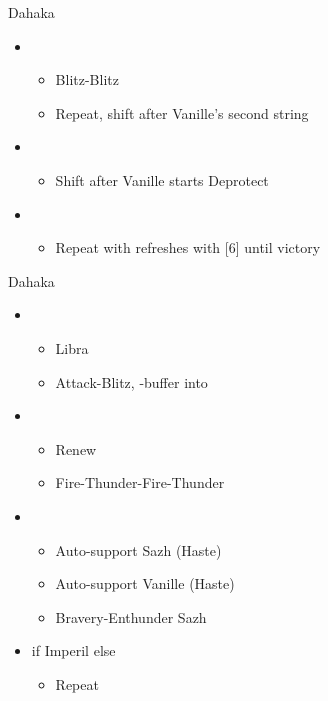 \begin{paracol}{2}
\begin{battle}{Dahaka}
\begin{itemize}
\begin{itemize}
			      \end{itemize}
			\item \second
			      \begin{itemize}
				      \item Blitz-Blitz
				      \item Repeat, shift after Vanille's second string
			      \end{itemize}
			\item \fifth
			      \begin{itemize}
				      \item Shift after Vanille starts Deprotect
			      \end{itemize}
			\item \fourth
			      \begin{itemize}
				      \item Repeat with refreshes with [6] until victory
			      \end{itemize}
		\end{itemize}
	\end{battle}
	\switchcolumn
	\begin{battle}{Dahaka}
		\begin{itemize}
			\item \second
			      \begin{itemize}
				      \item Libra
				      \item Attack-Blitz, \rav-buffer into
			      \end{itemize}
			\item \fifth
			      \begin{itemize}
				      \item Renew
				      \item Fire-Thunder-Fire-Thunder
			      \end{itemize}
			\item \first
			      \begin{itemize}
				      \item Auto-support Sazh (Haste)
				      \item Auto-support Vanille (Haste)
				      \item Bravery-Enthunder Sazh
			      \end{itemize}
			\item \fifth if Imperil else \third
			      \begin{itemize}
				      \item Repeat
			      \end{itemize}

\end{itemize}
\end{battle}
\end{paracol}
